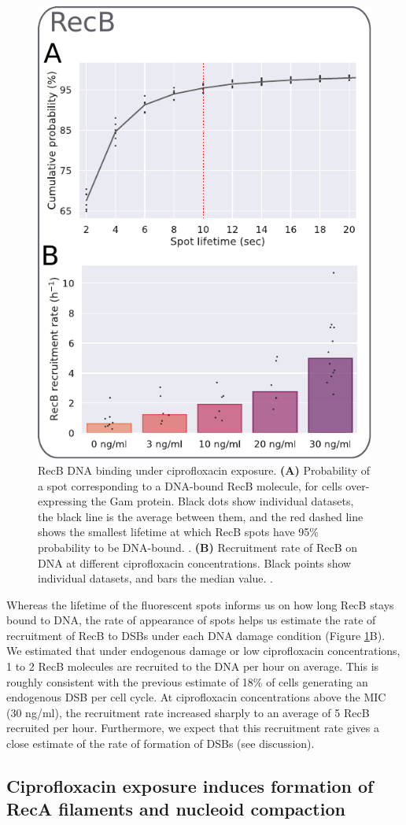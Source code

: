 \begin{figure}[htbp]
    \centering
    \includegraphics[width=.4\textwidth]{Figures/Fig2_RecB_recruitment.pdf}
    \caption{RecB DNA binding under ciprofloxacin exposure. \textbf{(A)} Probability of a spot corresponding to a DNA-bound RecB molecule, for cells over-expressing the Gam protein. Black dots show individual datasets, the black line is the average between them, and the red dashed line shows the smallest lifetime at which RecB spots have 95\% probability to be DNA-bound. .  \textbf{(B)} Recruitment rate of RecB on DNA at different ciprofloxacin concentrations. Black points show individual datasets, and bars the median value. . }
    \label{Fig:recruitment}
\end{figure}

Whereas the lifetime of the fluorescent spots informs us on how long RecB stays bound to DNA, the rate of appearance of spots helps us estimate the rate of recruitment of RecB to DSBs under each DNA damage condition (Figure \ref{Fig:recruitment}B). We estimated that under endogenous damage or low ciprofloxacin concentrations, 1 to 2 RecB molecules are recruited to the DNA per hour on average. This is roughly consistent with the previous estimate of 18\% of cells generating an endogenous DSB per cell cycle\cite{Sinha2018}. At ciprofloxacin concentrations above the MIC (30 ng/ml), the recruitment rate increased sharply to an average of 5 RecB recruited per hour. Furthermore, we expect that this recruitment rate gives a close estimate of the rate of formation of DSBs (see discussion).

\subsection*{Ciprofloxacin exposure induces formation of RecA filaments and nucleoid compaction}


